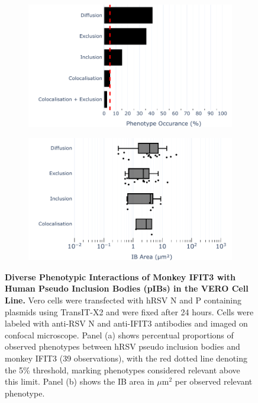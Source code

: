 \begin{figure}
    \begin{subfigure}{0.495\textwidth}
        \caption{}
        \includegraphics[width=1\linewidth]{09. Chapter 4/Figs/01. pIB/04. IFIT3/01. bar_i3_vero.pdf} 
    \end{subfigure}
    \begin{subfigure}{0.495\textwidth}
        \caption{}
        \includegraphics[width=1\linewidth]{09. Chapter 4/Figs/01. pIB/04. IFIT3/02. box_i3_vero.pdf}
    \end{subfigure}
    \caption[Diverse Phenotypic Interactions of Monkey IFIT3 with Human Pseudo Inclusion Bodies (pIBs) in the VERO Cell Line.]{\textbf{Diverse Phenotypic Interactions of Monkey IFIT3 with Human Pseudo Inclusion Bodies (pIBs) in the VERO Cell Line.} Vero cells were transfected with hRSV N and P containing plasmids using TransIT-X2 and were fixed after 24 hours. Cells were labeled with anti-RSV N and anti-IFIT3 antibodies and imaged on confocal microscope. Panel (a) shows percentual proportions of observed phenotypes between hRSV pseudo inclusion bodies and monkey IFIT3 (39 observations), with the red dotted line denoting the 5\% threshold, marking phenotypes considered relevant above this limit. Panel (b) shows the IB area in \(\mu \mbox{m}^2\) per observed relevant phenotype.}
    \label{fig:Diverse Phenotypic Interactions of Monkey IFIT3 with Human Pseudo Inclusion Bodies (pIBs) in the VERO Cell Line}
\end{figure}

